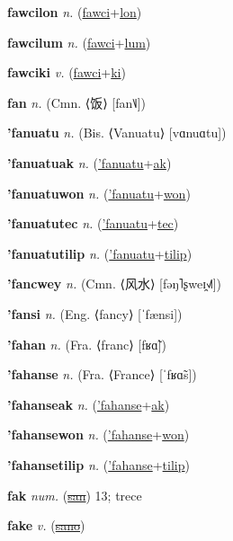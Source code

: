 \textbf{\hypertarget{fawcilon}{fawcilon}} \textit{n.} (\hyperlink{fawci}{fawci}+\allowbreak \hyperlink{lon}{lon})


\textbf{\hypertarget{fawcilum}{fawcilum}} \textit{n.} (\hyperlink{fawci}{fawci}+\allowbreak \hyperlink{lum}{lum})


\textbf{\hypertarget{fawciki}{fawciki}} \textit{v.} (\hyperlink{fawci}{fawci}+\allowbreak \hyperlink{ki}{ki})


\textbf{\hypertarget{fan}{fan}} \textit{n.} (Cmn. ⟨{\chinese{}饭}⟩ [fan˥˩])


\textbf{\hypertarget{'fanuatu}{'fanuatu}} \textit{n.} (Bis. ⟨Vanuatu⟩ [vɑnuɑtu])


\textbf{\hypertarget{'fanuatuak}{'fanuatuak}} \textit{n.} (\hyperlink{'fanuatu}{'fanuatu}+\allowbreak \hyperlink{ak}{ak})


\textbf{\hypertarget{'fanuatuwon}{'fanuatuwon}} \textit{n.} (\hyperlink{'fanuatu}{'fanuatu}+\allowbreak \hyperlink{won}{won})


\textbf{\hypertarget{'fanuatutec}{'fanuatutec}} \textit{n.} (\hyperlink{'fanuatu}{'fanuatu}+\allowbreak \hyperlink{tec}{tec})


\textbf{\hypertarget{'fanuatutilip}{'fanuatutilip}} \textit{n.} (\hyperlink{'fanuatu}{'fanuatu}+\allowbreak \hyperlink{tilip}{tilip})


\textbf{\hypertarget{'fancwey}{'fancwey}} \textit{n.} (Cmn. ⟨{\chinese{}风水}⟩ [fəŋ˥ʂweɪ̯˧˩˥])


\textbf{\hypertarget{'fansi}{'fansi}} \textit{n.} (Eng. ⟨fancy⟩ [ˈfænsi])


\textbf{\hypertarget{'fahan}{'fahan}} \textit{n.} (Fra. ⟨franc⟩ [fʁɑ̃])


\textbf{\hypertarget{'fahanse}{'fahanse}} \textit{n.} (Fra. ⟨France⟩ [ˈfʁɑ̃s])


\textbf{\hypertarget{'fahanseak}{'fahanseak}} \textit{n.} (\hyperlink{'fahanse}{'fahanse}+\allowbreak \hyperlink{ak}{ak})


\textbf{\hypertarget{'fahansewon}{'fahansewon}} \textit{n.} (\hyperlink{'fahanse}{'fahanse}+\allowbreak \hyperlink{won}{won})


\textbf{\hypertarget{'fahansetilip}{'fahansetilip}} \textit{n.} (\hyperlink{'fahanse}{'fahanse}+\allowbreak \hyperlink{tilip}{tilip})


\textbf{\hypertarget{fak}{fak}} \textit{num.} (\hyperlink{san}{\sout{san}})
13; trece

\textbf{\hypertarget{fake}{fake}} \textit{v.} (\hyperlink{sano}{\sout{sano}})


